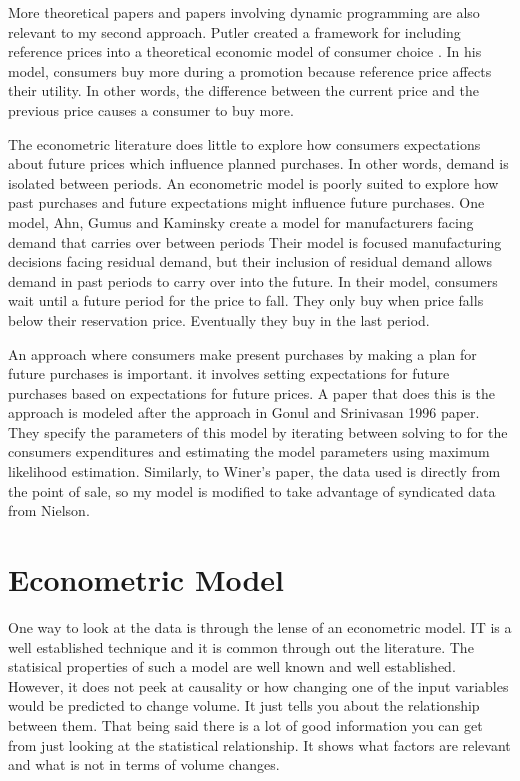 \documentclass{article}
\begin{document}
More theoretical papers and papers involving dynamic programming are also relevant to my second approach. Putler created a framework for including reference prices into a theoretical economic model of consumer choice \cite{putler}. In his model, consumers buy more during a promotion because reference price affects their utility. In other words, the difference between the current price and the previous price causes a consumer to buy more.

The econometric literature does little to explore how consumers expectations about future prices which influence planned purchases. In other words, demand is isolated between periods.  An econometric model is poorly suited to explore how past purchases and future expectations might influence future purchases. One model, Ahn, Gumus and Kaminsky create a model for manufacturers facing demand that carries over between periods \cite{ahn} Their model is focused manufacturing decisions facing residual demand, but their inclusion of residual demand allows demand in past periods to carry over into the future. In their model, consumers wait until a future period for the price to fall. They only buy when price falls below their reservation price. Eventually they buy in the last period.

An approach where consumers make present purchases by making a plan for future purchases is important. it involves setting expectations for future purchases based on expectations for future prices. A paper that does this is  the approach is modeled after the approach in Gonul and Srinivasan 1996 paper\cite{gonul}. They specify the parameters of this model by iterating between solving to for the consumers expenditures and estimating the model parameters using maximum likelihood estimation. Similarly, to Winer's paper,  the data used is directly from the point of sale, so my model is modified to take advantage of syndicated data from Nielson.


\section{Econometric Model}

One way to look at the data is through the lense of an econometric model. IT is a well established technique and it is common through out the literature. The statisical properties of such a model are well known and well established. However, it does not peek at causality or how changing one of the input variables would be predicted to change volume. It just tells you about the relationship between them. That being said there is a lot of good information you can get from just looking at the statistical relationship. It shows what factors are relevant and what is not in terms of volume changes.
\end{document}
